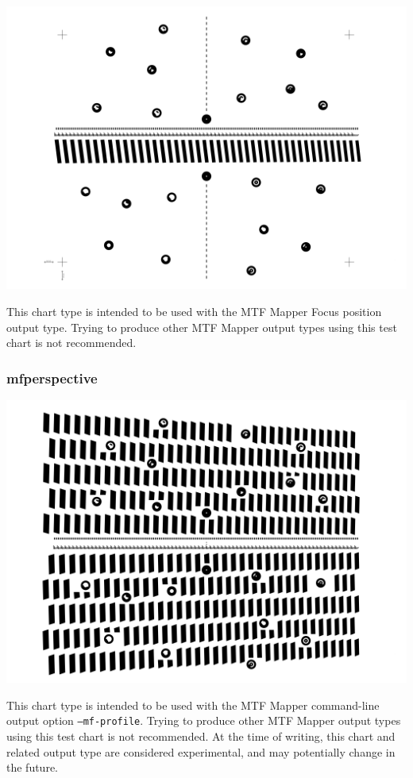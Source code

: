 \documentclass[a4paper]{article}
\begin{document}
\parbox{\textwidth}{
\centering
\includegraphics[width=\textwidth]{figures/chart_focus}
}
\vspace{1ex}

This chart type is intended to be used with the MTF Mapper \textsf{Focus
position} output type. Trying to produce other MTF Mapper output types using
this test chart is not recommended.

\subsubsection{mfperspective}

\parbox{\textwidth}{
\centering
\includegraphics[width=\textwidth]{figures/chart_mfperspective}
}

This chart type is intended to be used with the MTF Mapper command-line
output option \texttt{--mf-profile}. 
Trying to produce other MTF Mapper output types using this test chart is not recommended.
At the time of writing, this chart and related output type are considered
experimental, and may potentially change in the future.
\end{document}
